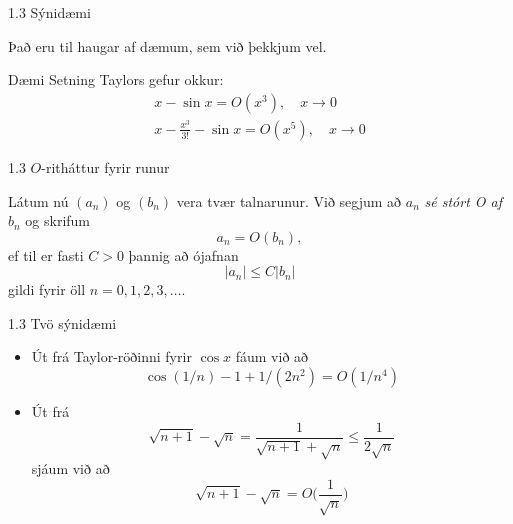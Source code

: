 %
\begin{frame}{1.3 Sýnidæmi} 

Það eru til haugar af dæmum, sem við þekkjum vel. \pause

% 
\begin{block}{Dæmi}
Setning Taylors gefur okkur:
\begin{gather*}
    x - \sin x = O(x^3), \quad x \to 0\\
    x - \frac{x^3}{3!} - \sin x = O(x^5), \quad x \to 0
\end{gather*}
\end{block}
\end{frame}
%

%
\begin{frame}{1.3 $O$-ritháttur fyrir runur} 


Látum nú $(a_n)$ og $(b_n)$ vera tvær talnarunur. 
Við segjum að $a_n$ {\it sé stórt O af} $b_n$ og skrifum 
\begin{equation*}
    a_n = O(b_n), 
\end{equation*}
ef til er fasti $C>0$ þannig að ójafnan
\begin{equation*}
    |a_n| \leq C|b_n|
\end{equation*}
gildi fyrir öll $n=0,1,2,3,\dots$. 

\end{frame}

%
\begin{frame}{1.3 Tvö sýnidæmi} 
\begin{itemize}
 \item Út frá Taylor-röðinni fyrir $\cos x$ fáum við að
\begin{equation*}
    \cos(1/n)-1+1/(2n^2) = O(1/n^4)
\end{equation*} \pause
\item Út frá 
\begin{equation*}
    \sqrt{n+1}-\sqrt n = \dfrac{1}{\sqrt{n+1}+\sqrt n} \leq \frac{1}{2\sqrt n}
\end{equation*}\pause
sjáum við að
\begin{equation*}
    \sqrt{n+1}-\sqrt n = O\big(\dfrac 1{\sqrt n}\big)
\end{equation*}
\end{itemize}
\end{frame}


